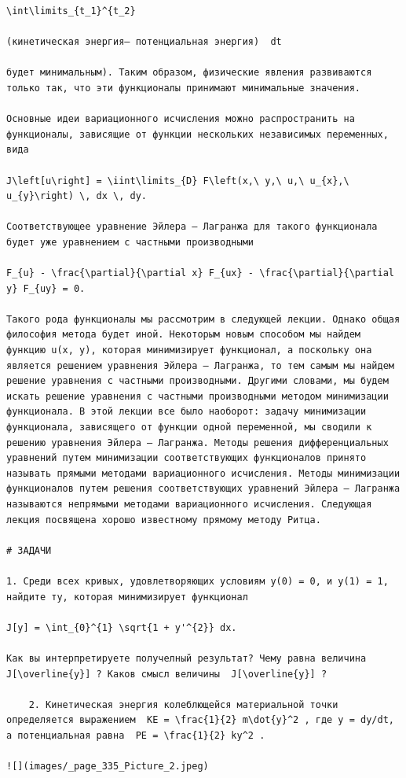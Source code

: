 \documentclass[
  ukrainian,
]{article}
\begin{document}
\begin{verbatim}
\int\limits_{t_1}^{t_2}

(кинетическая энергия— потенциальная энергия)  dt

будет минимальным). Таким образом, физические явления развиваются только так, что эти функционалы принимают минимальные значения.

Основные идеи вариационного исчисления можно распространить на функционалы, зависящие от функции нескольких независимых переменных, вида

J\left[u\right] = \iint\limits_{D} F\left(x,\ y,\ u,\ u_{x},\ u_{y}\right) \, dx \, dy.

Соответствующее уравнение Эйлера — Лагранжа для такого функционала будет уже уравнением с частными производными

F_{u} - \frac{\partial}{\partial x} F_{ux} - \frac{\partial}{\partial y} F_{uy} = 0.

Такого рода функционалы мы рассмотрим в следующей лекции. Однако общая философия метода будет иной. Некоторым новым способом мы найдем функцию u(x, y), которая минимизирует функционал, а поскольку она является решением уравнения Эйлера — Лагранжа, то тем самым мы найдем решение уравнения с частными производными. Другими словами, мы будем искать решение уравнения с частными производными методом минимизации функционала. В этой лекции все было наоборот: задачу минимизации функционала, зависящего от функции одной переменной, мы сводили к решению уравнения Эйлера — Лагранжа. Методы решения дифференциальных уравнений путем минимизации соответствующих функционалов принято называть прямыми методами вариационного исчисления. Методы минимизации функционалов путем решения соответствующих уравнений Эйлера — Лагранжа называются непрямыми методами вариационного исчисления. Следующая лекция посвящена хорошо известному прямому методу Ритца.

# ЗАДАЧИ

1. Среди всех кривых, удовлетворяющих условиям y(0) = 0, и y(1) = 1, найдите ту, которая минимизирует функционал

J[y] = \int_{0}^{1} \sqrt{1 + y'^{2}} dx.

Как вы интерпретируете получелный результат? Чему равна величина  J[\overline{y}] ? Каков смысл величины  J[\overline{y}] ?

    2. Кинетическая энергия колеблющейся материальной точки определяется выражением  KE = \frac{1}{2} m\dot{y}^2 , где y = dy/dt, а потенциальная равна  PE = \frac{1}{2} ky^2 .

![](images/_page_335_Picture_2.jpeg)


\end{verbatim}
\end{document}
